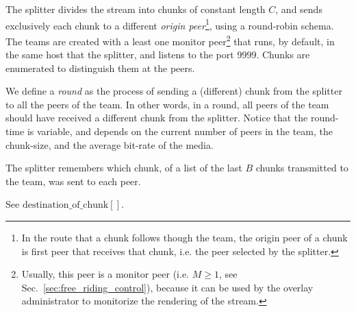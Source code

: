 
\label{sec:feeding_the_team}

The splitter divides the stream into chunks of constant length $C$,
and sends exclusively each chunk to a different \emph{origin
  peer}\footnote{In the route that a chunk follows though the team,
  the origin peer of a chunk is first peer that receives that chunk,
  i.e. the peer selected by the splitter.}, using a round-robin
schema. The teams are created with a least one monitor
peer\footnote{Usually, this peer is a monitor peer (i.e. $M\geq 1$,
  see Sec.~\ref{sec:free_riding_control}), because it can be used by
  the overlay administrator to monitorize the rendering of the
  stream.} that runs, by default, in the same host that the splitter,
and listens to the port 9999. Chunks are enumerated to distinguish
them at the peers.

\begin{comment}
More details about the implementation
are available in Fig.~\ref{fig:chunk_generation}.


\begin{figure*}
  \fig{500}{5cm}{DBS_splitter_feed} \caption{Chunk
    generation at the splitter and their transmission to the
    team.\label{fig:chunk_generation}}
\end{figure*}
\end{comment}

We define a \emph{round} as the process of sending a (different) chunk
from the splitter to all the peers of the team. In other words, in a
round, all peers of the team should have received a different chunk
from the splitter. Notice that the round-time is variable, and depends
on the current number of peers in the team, the chunk-size, and the
average bit-rate of the media.

The splitter remembers which chunk, of a list of the last $B$ chunks
transmitted to the team, was sent to each peer.

\begin{notex}
  See \href{https://github.com/P2PSP/simulator/blob/f0c73be1817e7d3b816cc61cd2c8e59b17f9a0e6/src/core/splitter_dbs.py#L296}{$\text{destination\_of\_chunk}[]$}.
\end{notex}

